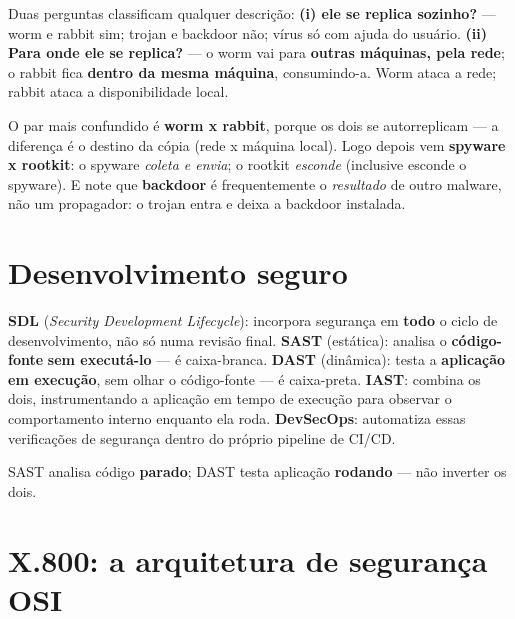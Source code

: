 \begin{regrapratica}
Duas perguntas classificam qualquer descrição: \textbf{(i) ele se replica
sozinho?} --- worm e rabbit sim; trojan e backdoor não; vírus só com ajuda
do usuário. \textbf{(ii) Para onde ele se replica?} --- o worm vai para
\textbf{outras máquinas, pela rede}; o rabbit fica \textbf{dentro da mesma
máquina}, consumindo-a. Worm ataca a rede; rabbit ataca a disponibilidade
local.
\end{regrapratica}

\begin{cuidado}
O par mais confundido é \textbf{worm x rabbit}, porque os dois se
autorreplicam --- a diferença é o destino da cópia (rede x máquina local).
Logo depois vem \textbf{spyware x rootkit}: o spyware \emph{coleta e
envia}; o rootkit \emph{esconde} (inclusive esconde o spyware). E note que
\textbf{backdoor} é frequentemente o \emph{resultado} de outro malware, não
um propagador: o trojan entra e deixa a backdoor instalada.
\end{cuidado}

\section{Desenvolvimento seguro}

\begin{conceito}
\textbf{SDL} (\textit{Security Development Lifecycle}): incorpora
segurança em \textbf{todo} o ciclo de desenvolvimento, não só numa
revisão final. \textbf{SAST} (estática): analisa o \textbf{código-fonte}
\textbf{sem executá-lo} --- é caixa-branca. \textbf{DAST} (dinâmica):
testa a \textbf{aplicação em execução}, sem olhar o código-fonte --- é
caixa-preta. \textbf{IAST}: combina os dois, instrumentando a aplicação
em tempo de execução para observar o comportamento interno enquanto ela
roda. \textbf{DevSecOps}: automatiza essas verificações de segurança
dentro do próprio pipeline de CI/CD.
\end{conceito}

\begin{cuidado}
SAST analisa código \textbf{parado}; DAST testa aplicação \textbf{rodando}
--- não inverter os dois.
\end{cuidado}

\section{X.800: a arquitetura de segurança OSI}

